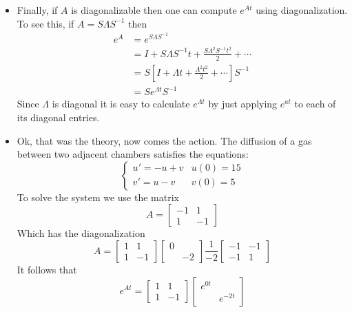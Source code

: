 \documentclass[11pt,oneside]{amsbook}
\theoremstyle{definition}
\theoremstyle{plain}
\theoremstyle{definition}
\theoremstyle{remark}
\numberwithin{equation}{section}
\numberwithin{figure}{section}
\begin{document}
\begin{itemize}
\begin{align*}
    &=\frac{d}{dt}\left[
      I+At+\frac{(At)^2}{2}+\frac{(At)^3}{3!}+\cdots
      \right]\mathbf{u}_0\\
    &=\left[0+A+A^2t+A\frac{(At)^2}{2}+\cdots\right]
      \mathbf{u}_0\\
    &=A\left[I+At+\frac{(At)^2}{2}+\cdots\right]\mathbf{u}_0\\
    &=Ae^{At}\mathbf{u}_0
  \end{align*}
\item Finally, if $A$ is diagonalizable then one can compute $e^{At}$ using diagonalization. To see this, if $A=S\Lambda S^{-1}$ then
  \begin{align*}
    e^A&=e^{S\Lambda S^{-1}}\\
       &=I+S\Lambda S^{-1}t+\frac{S\Lambda^2S^{-1}t^2}{2}
         +\cdots\\
       &=S\left[I+\Lambda t+\frac{\Lambda^2t^2}{2}+\cdots
         \right]S^{-1}\\
       &=Se^{\Lambda t}S^{-1}
  \end{align*}
  Since $\Lambda$ is diagonal it is easy to calculate $e^{\Lambda t}$ by just applying $e^{at}$ to each of its diagonal entries.
\item Ok, that was the theory, now comes the action. The diffusion of a gas between two adjacent chambers satisfies the equations:
    \[\begin{cases}
      u'=-u+v & u(0)=15\\
      v'=u-v & v(0)=5
    \end{cases}
  \]
  To solve the system we use the matrix
  \[A=\begin{bmatrix}-1&1\\1&-1\end{bmatrix}
  \]
  Which has the diagonalization
  \[A=\begin{bmatrix}1&1\\1&-1\end{bmatrix}
    \begin{bmatrix}0\\&-2\end{bmatrix}
    \frac{1}{-2}
    \begin{bmatrix}-1&-1\\-1&1\end{bmatrix}
  \]
  It follows that
  \[e^{At}=\begin{bmatrix}1&1\\1&-1\end{bmatrix}
    \begin{bmatrix}e^{0t}\\&e^{-2t}\end{bmatrix}
\]
\end{itemize}
\end{document}
